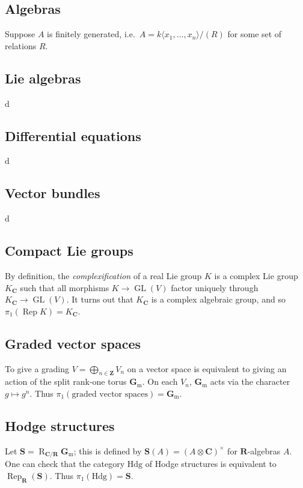 \documentclass{article}
\DeclareMathOperator{\GL}{GL}
\DeclareMathOperator{\rep}{Rep}
\DeclareMathOperator{\weil}{R}
\newcommand{\dC}{\mathbf{C}}
\newcommand{\dR}{\mathbf{R}}
\newcommand{\dS}{\mathbf{S}}
\newcommand{\dZ}{\mathbf{Z}}
\newcommand{\Gm}{\mathbf{G}_\mathrm{m}}
\newcommand{\hodge}{\mathrm{Hdg}}
\begin{document}
\subsection{Algebras}

Suppose $A$ is finitely generated, i.e.~$A=k\langle x_1,\dots,x_n\rangle/(R)$ 
for some set of relations $R$. 


\subsection{Lie algebras}

d


\subsection{Differential equations}

d


\subsection{Vector bundles}

d


\subsection{Compact Lie groups}

By definition, the \emph{complexification} of a real Lie group $K$ is a complex 
Lie group $K_\dC$ such that all morphisms $K\to \GL(V)$ factor uniquely through 
$K_\dC\to\GL(V)$. It turns out that $K_\dC$ is a complex algebraic group, and 
so $\pi_1(\rep K)=K_\dC$. 


\subsection{Graded vector spaces}

To give a grading $V=\bigoplus_{n\in \dZ} V_n$ on a vector space is equivalent 
to giving an action of the split rank-one torus $\Gm$. On each $V_n$, $\Gm$ 
acts via the character $g\mapsto g^n$. Thus 
$\pi_1(\text{graded vector spaces})=\Gm$. 


\subsection{Hodge structures}

Let $\dS=\weil_{\dC/\dR}\Gm$; this is defined by $\dS(A)=(A\otimes\dC)^\times$ 
for $\dR$-algebras $A$. One can check that the category $\hodge$ of Hodge 
structures is equivalent to $\rep_\dR(\dS)$. Thus $\pi_1(\hodge)=\dS$. 





\printbibliography
\end{document}
